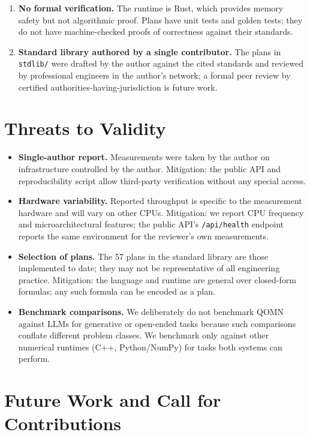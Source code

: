 \documentclass[11pt,a4paper]{article}
\begin{document}
\begin{enumerate}[leftmargin=*]
\item \textbf{No formal verification.} The runtime is Rust, which provides memory safety but not algorithmic proof. Plans have unit tests and golden tests; they do not have machine-checked proofs of correctness against their standards.
\item \textbf{Standard library authored by a single contributor.} The plans in \texttt{stdlib/} were drafted by the author against the cited standards and reviewed by professional engineers in the author's network; a formal peer review by certified authorities-having-jurisdiction is future work.
\end{enumerate}

\section{Threats to Validity}
\label{sec:threats}

\begin{itemize}[leftmargin=*]
\item \textbf{Single-author report.} Measurements were taken by the author on infrastructure controlled by the author. Mitigation: the public API and reproducibility script allow third-party verification without any special access.
\item \textbf{Hardware variability.} Reported throughput is specific to the measurement hardware and will vary on other CPUs. Mitigation: we report CPU frequency and microarchitectural features; the public API's \texttt{/api/health} endpoint reports the same environment for the reviewer's own measurements.
\item \textbf{Selection of plans.} The 57 plans in the standard library are those implemented to date; they may not be representative of all engineering practice. Mitigation: the language and runtime are general over closed-form formulas; any such formula can be encoded as a plan.
\item \textbf{Benchmark comparisons.} We deliberately do not benchmark QOMN against LLMs for generative or open-ended tasks because such comparisons conflate different problem classes. We benchmark only against other numerical runtimes (C++, Python/NumPy) for tasks both systems can perform.
\end{itemize}

\section{Future Work and Call for Contributions}
\label{sec:future}
\end{document}
